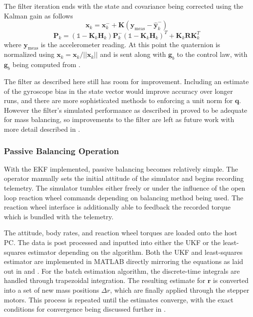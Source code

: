 The filter iteration ends with the state and covariance being corrected using the Kalman gain as follows
\begin{equation}
    \bm{x}_k = \bm{x}_k^- + \bm{K}(\bm{y}_{\text{meas}}-\hat{\bm{y}}_k^-)
\end{equation}
\begin{equation}
    \bm{P}_k = (\mathbb{1} - \bm{K}_k\bm{H}_k)\bm{P}_k^-(\mathbb{1} - \bm{K}_k\bm{H}_k)^T
    + \bm{K}_k\bm{R}\bm{K}_k^T
\end{equation}
where $\bm{y}_{\text{meas}}$ is the accelerometer reading. At this point the quaternion is normalized using $\bm{x}_k = \bm{x}_k / ||\bm{x}_k||$ and is sent along with $\bm{g}_b$ to the control law, with $\bm{g}_b$ being computed from .

The filter as described here still has room for improvement. Including an estimate of the gyroscope bias in the state vector would improve accuracy over longer runs, and there are more sophisticated methods to enforcing a unit norm for $\bm{q}$. However the filter's simulated performance as described in  proved to be adequate for mass balancing, so improvements to the filter are left as future work with more detail described in .

\subsubsection{Passive Balancing Operation}

With the EKF implemented, passive balancing becomes relatively simple. The operator manually sets the initial attitude of the simulator and begins recording telemetry. The simulator tumbles either freely or under the influence of the open loop reaction wheel commands depending on balancing method being used. The reaction wheel interface is additionally able to feedback the recorded torque which is bundled with the telemetry. 

The attitude, body rates, and reaction wheel torques are loaded onto the host PC. The data is post processed and inputted into either the UKF or the least-squares estimator depending on the algorithm. Both the UKF and least-squares estimator are implemented in MATLAB directly mirroring the equations as laid out in  and . For the batch estimation algorithm, the discrete-time integrals are handled through trapezoidal integration. The resulting estimate for $\bm{r}$ is converted into a set of new mass positions $\Delta{r}$, which are finally applied through the stepper motors. This process is repeated until the estimates converge, with the exact conditions for convergence being discussed further in . 

